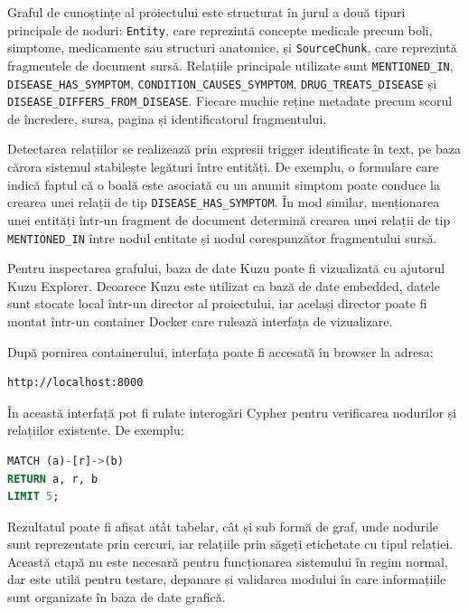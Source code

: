 \documentclass[12pt, a4paper, oneside, romanian]{teza-upb}
\begin{document}
Graful de cunoștințe al proiectului este structurat în jurul a două tipuri principale de noduri: \texttt{Entity}, care reprezintă concepte medicale precum boli, simptome, medicamente sau structuri anatomice, și \texttt{SourceChunk}, care reprezintă fragmentele de document sursă. Relațiile principale utilizate sunt \texttt{MENTIONED\_IN}, \texttt{DISEASE\_HAS\_SYMPTOM}, \texttt{CONDITION\_CAUSES\_SYMPTOM}, \texttt{DRUG\_TREATS\_DISEASE} și \texttt{DISEASE\_DIFFERS\_FROM\_DISEASE}. Fiecare muchie reține metadate precum scorul de încredere, sursa, pagina și identificatorul fragmentului.

Detectarea relațiilor se realizează prin expresii trigger identificate în text, pe baza cărora sistemul stabilește legături între entități. De exemplu, o formulare care indică faptul că o boală este asociată cu un anumit simptom poate conduce la crearea unei relații de tip \texttt{DISEASE\_HAS\_SYMPTOM}. În mod similar, menționarea unei entități într-un fragment de document determină crearea unei relații de tip \texttt{MENTIONED\_IN} între nodul entitate și nodul corespunzător fragmentului sursă.

Pentru inspectarea grafului, baza de date Kuzu poate fi vizualizată cu ajutorul Kuzu Explorer. Deoarece Kuzu este utilizat ca bază de date embedded, datele sunt stocate local într-un director al proiectului, iar același director poate fi montat într-un container Docker care rulează interfața de vizualizare.

După pornirea containerului, interfața poate fi accesată în browser la adresa:

\begin{lstlisting}
http://localhost:8000
\end{lstlisting}

În această interfață pot fi rulate interogări Cypher pentru verificarea nodurilor și relațiilor existente. De exemplu:

\begin{center}
\begin{minipage}{0.42\textwidth}
\begin{lstlisting}[language=SQL, frame=single, framesep=4pt]
MATCH (a)-[r]->(b)
RETURN a, r, b
LIMIT 5;
\end{lstlisting}
\end{minipage}
\end{center}

Rezultatul poate fi afișat atât tabelar, cât și sub formă de graf, unde nodurile sunt reprezentate prin cercuri, iar relațiile prin săgeți etichetate cu tipul relației. Această etapă nu este necesară pentru funcționarea sistemului în regim normal, dar este utilă pentru testare, depanare și validarea modului în care informațiile sunt organizate în baza de date grafică.
\end{document}
